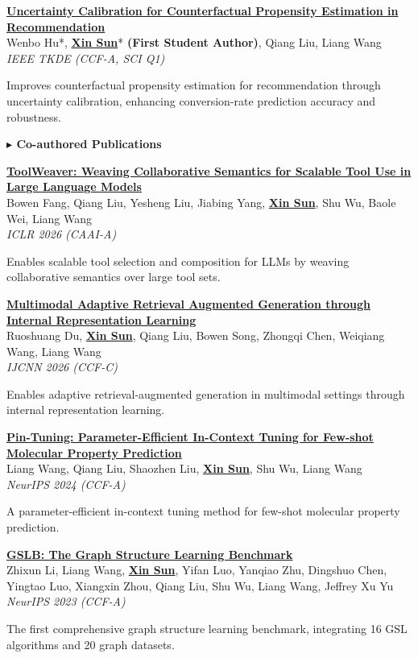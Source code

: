 \documentclass[letterpaper,11pt]{article}
\newcommand{\pubentry}[6]{
  \Needspace{6\baselineskip}
  \item \textbf{\href{#1}{#2}} \\
  {\small #3} \\
  {\small \textit{#4}\hfill #5}
  {#6\par}
  \vspace{0pt}
}
\begin{document}
\begin{enumerate}[leftmargin=0.3in, label={[\arabic*]}]
  \pubentry{https://arxiv.org/abs/2303.12973}{Uncertainty Calibration for Counterfactual Propensity Estimation in Recommendation}
  {Wenbo Hu*, \textbf{\underline{Xin Sun}}* \textbf{(First Student Author)}, Qiang Liu, Liang Wang}
  {IEEE TKDE (CCF-A, SCI Q1)}{}
  {\small\color{secondary} Improves counterfactual propensity estimation for recommendation through uncertainty calibration, enhancing conversion-rate prediction accuracy and robustness.}

\end{enumerate}

\vspace{2pt}
\textbf{\color{primary} $\blacktriangleright$ \quad Co-authored Publications}
\begin{enumerate}[leftmargin=0.3in, label={[\arabic*]}, resume]

  \pubentry{https://arxiv.org/abs/2601.21947}{ToolWeaver: Weaving Collaborative Semantics for Scalable Tool Use in Large Language Models}
  {Bowen Fang, Qiang Liu, Yesheng Liu, Jiabing Yang, \textbf{\underline{Xin Sun}}, Shu Wu, Baole Wei, Liang Wang}
  {ICLR 2026 (CAAI-A)}{}
  {\small\color{secondary} Enables scalable tool selection and composition for LLMs by weaving collaborative semantics over large tool sets.}

  \pubentry{https://arxiv.org/abs/2603.00511}{Multimodal Adaptive Retrieval Augmented Generation through Internal Representation Learning}
  {Ruoshuang Du, \textbf{\underline{Xin Sun}}, Qiang Liu, Bowen Song, Zhongqi Chen, Weiqiang Wang, Liang Wang}
  {IJCNN 2026 (CCF-C)}{}
  {\small\color{secondary} Enables adaptive retrieval-augmented generation in multimodal settings through internal representation learning.}

  \pubentry{https://proceedings.neurips.cc/paper_files/paper/2024/hash/82a9fb94035dad3ec007de4ad13c6748-Abstract-Conference.html}{Pin-Tuning: Parameter-Efficient In-Context Tuning for Few-shot Molecular Property Prediction}
  {Liang Wang, Qiang Liu, Shaozhen Liu, \textbf{\underline{Xin Sun}}, Shu Wu, Liang Wang}
  {NeurIPS 2024 (CCF-A)}{}
  {\small\color{secondary} A parameter-efficient in-context tuning method for few-shot molecular property prediction.}

  \pubentry{https://proceedings.neurips.cc/paper_files/paper/2023/hash/60bc87f3cf5257579435d92ec12c761b-Abstract-Datasets_and_Benchmarks.html}{GSLB: The Graph Structure Learning Benchmark}
  {Zhixun Li, Liang Wang, \textbf{\underline{Xin Sun}}, Yifan Luo, Yanqiao Zhu, Dingshuo Chen, Yingtao Luo, Xiangxin Zhou, Qiang Liu, Shu Wu, Liang Wang, Jeffrey Xu Yu}
  {NeurIPS 2023 (CCF-A)}{}
  {\small\color{secondary} The first comprehensive graph structure learning benchmark, integrating 16 GSL algorithms and 20 graph datasets.}

\end{enumerate}
\end{document}
